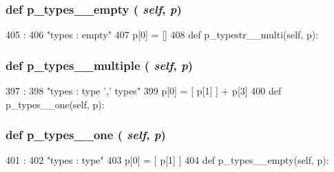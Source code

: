\begin{DoxyVerb}
{\subsubsection[{p\_\-types\_\-\_\-empty}]{\setlength{\rightskip}{0pt plus 5cm}def p\_\-types\_\-\_\-empty ( {\em self}, \/   {\em p})}}
\label{classslicc_1_1parser_1_1SLICC_aa1ad43d69028fac967854e05a8512a59}



\begin{DoxyCode}
405                                :
406         "types : empty"
407         p[0] = []
408 
    def p_typestr__multi(self, p):
\end{DoxyCode}
\hypertarget{classslicc_1_1parser_1_1SLICC_a0589504fd03089550efdea0a4c8c705b}{
\subsubsection[{p\_\-types\_\-\_\-multiple}]{\setlength{\rightskip}{0pt plus 5cm}def p\_\-types\_\-\_\-multiple ( {\em self}, \/   {\em p})}}
\label{classslicc_1_1parser_1_1SLICC_a0589504fd03089550efdea0a4c8c705b}



\begin{DoxyCode}
397                                   :
398         "types : type ',' types"
399         p[0] = [ p[1] ] + p[3]
400 
    def p_types__one(self, p):
\end{DoxyCode}
\hypertarget{classslicc_1_1parser_1_1SLICC_a487617131fe6224cd4c4b0132f3c3ac9}{
\subsubsection[{p\_\-types\_\-\_\-one}]{\setlength{\rightskip}{0pt plus 5cm}def p\_\-types\_\-\_\-one ( {\em self}, \/   {\em p})}}
\label{classslicc_1_1parser_1_1SLICC_a487617131fe6224cd4c4b0132f3c3ac9}



\begin{DoxyCode}
401                              :
402         "types : type"
403         p[0] = [ p[1] ]
404 
    def p_types__empty(self, p):
\end{DoxyCode}
\hypertarget{classslicc_1_1parser_1_1SLICC_a3bcdc6f6c174bab04271d90873cf8eaa}{
}
\end{DoxyVerb}
